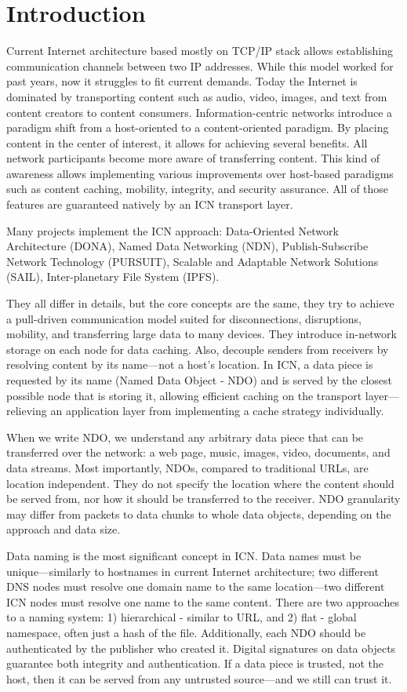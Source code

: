 \chapter{Introduction}
\label{introduction}
Current Internet architecture based mostly on TCP/IP stack allows establishing communication channels between two IP addresses. While this model worked for past years, now it struggles to fit current demands. Today the Internet is dominated by transporting content such as audio, video, images, and text from content creators to content consumers. Information-centric networks introduce a paradigm shift from a host-oriented to a content-oriented paradigm. By placing content in the center of interest, it allows for achieving several benefits. All network participants become more aware of transferring content. This kind of awareness allows implementing various improvements over host-based paradigms such as content caching, mobility, integrity, and security assurance. All of those features are guaranteed natively by an ICN transport layer.

Many projects implement the ICN approach: Data-Oriented Network Architecture (DONA), Named Data Networking (NDN), Publish-Subscribe Network Technology (PURSUIT), Scalable and Adaptable Network Solutions (SAIL), Inter-planetary File System (IPFS).

They all differ in details, but the core concepts are the same, they try to achieve a pull-driven communication model suited for disconnections, disruptions, mobility, and transferring large data to many devices. They introduce in-network storage on each node for data caching. Also, decouple senders from receivers by resolving content by its name––not a host's location. 
In ICN, a data piece is requested by its name (Named Data Object - NDO) and is served by the closest possible node that is storing it, allowing efficient caching on the transport layer––relieving an application layer from implementing a cache strategy individually.

When we write NDO, we understand any arbitrary data piece that can be transferred over the network: a web page, music, images, video, documents, and data streams. Most importantly, NDOs, compared to traditional URLs, are location independent. They do not specify the location where the content should be served from, nor how it should be transferred to the receiver. NDO granularity may differ from packets to data chunks to whole data objects, depending on the approach and data size.

Data naming is the most significant concept in ICN. Data names must be unique––similarly to hostnames in current Internet architecture; two different DNS nodes must resolve one domain name to the same location––two different ICN nodes must resolve one name to the same content. 
There are two approaches to a naming system: 1) hierarchical - similar to URL, and 2) flat - global namespace, often just a hash of the file.
Additionally, each NDO should be authenticated by the publisher who created it. Digital signatures on data objects guarantee both integrity and authentication. If a data piece is trusted, not the host, then it can be served from any untrusted source––and we still can trust it.

